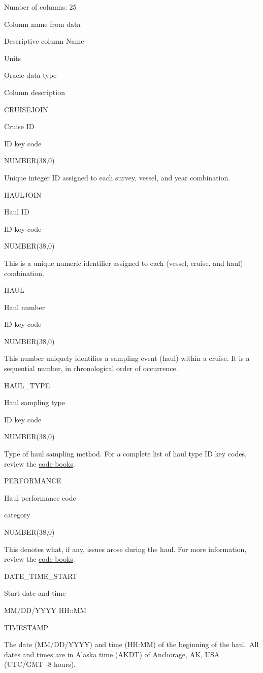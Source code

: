\documentclass[
  letterpaper,
  oneside,
  open=any]{scrbook}
\begin{document}
Number of columns: 25

Column name from data

Descriptive column Name

Units

Oracle data type

Column description

CRUISEJOIN

Cruise ID

ID key code

NUMBER(38,0)

Unique integer ID assigned to each survey, vessel, and year combination.

HAULJOIN

Haul ID

ID key code

NUMBER(38,0)

This is a unique numeric identifier assigned to each (vessel, cruise,
and haul) combination.

HAUL

Haul number

ID key code

NUMBER(38,0)

This number uniquely identifies a sampling event (haul) within a cruise.
It is a sequential number, in chronological order of occurrence.

HAUL\_TYPE

Haul sampling type

ID key code

NUMBER(38,0)

Type of haul sampling method. For a complete list of haul type ID key
codes, review the
\href{https://www.fisheries.noaa.gov/resource/document/groundfish-survey-species-code-manual-and-data-codes-manual}{code
books}.

PERFORMANCE

Haul performance code

category

NUMBER(38,0)

This denotes what, if any, issues arose during the haul. For more
information, review the
\href{https://www.fisheries.noaa.gov/resource/document/groundfish-survey-species-code-manual-and-data-codes-manual}{code
books}.

DATE\_TIME\_START

Start date and time

MM/DD/YYYY HH::MM

TIMESTAMP

The date (MM/DD/YYYY) and time (HH:MM) of the beginning of the haul. All
dates and times are in Alaska time (AKDT) of Anchorage, AK, USA (UTC/GMT
-8 hours).
\end{document}
